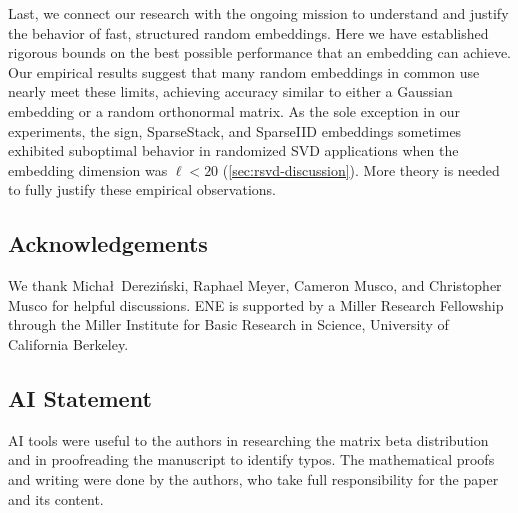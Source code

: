 \documentclass[11pt]{article}
\theoremstyle{definition}
\numberwithin{equation}{section}
\begin{document}
Last, we connect our research with the ongoing mission to understand and justify the behavior of fast, structured random embeddings.
Here we have established rigorous bounds on the best possible performance that an embedding can achieve.
Our empirical results suggest that many random embeddings in common use nearly meet these limits, achieving accuracy similar to either a Gaussian embedding or a random orthonormal matrix.
As the sole exception in our experiments, the sign, SparseStack, and SparseIID embeddings sometimes exhibited suboptimal behavior in randomized SVD applications when the embedding dimension was $\ell < 20$ (\cref{sec:rsvd-discussion}).
More theory is needed to fully justify these empirical observations.

\subsection*{Acknowledgements}

We thank Micha\l\ Derezi\'nski, Raphael Meyer, Cameron Musco, and Christopher Musco for helpful discussions.
ENE is supported by a Miller Research Fellowship through the Miller Institute for Basic Research in Science, University
of California Berkeley.

\subsection*{AI Statement}

AI tools were useful to the authors in researching the matrix beta distribution and in proofreading the manuscript to identify typos.
The mathematical proofs and writing were done by the authors, who take full responsibility for the paper and its content.

\scriptsize

\let\oldthebibliography=\thebibliography
\let\endoldthebibliography=\endthebibliography
\renewenvironment{thebibliography}[1]%
  {\begin{oldthebibliography}{#1}%
   \setlength{\itemsep}{2pt}%
   \setlength{\parskip}{2pt}%
  }%
  {\end{oldthebibliography}}

\end{document}
